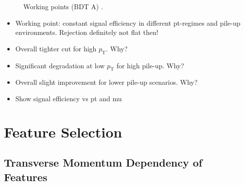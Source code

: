\begin{figure}[ht]
\begin{subfigure}[t]{0.48\textwidth}
  \end{subfigure}
  \caption{Working points (BDT A) .
    }
\end{figure}


\begin{itemize}
\item Working point: constant signal efficiency in different pt-regimes and
  pile-up environments. Rejection definitely not flat then!
\item Overall tighter cut for high $p_\text{T}$. Why?
\item Significant degradation at low $p_\text{T}$ for high pile-up. Why?
\item Overall slight improvement for lower pile-up scenarios. Why?
\item Show signal efficiency vs pt and mu
\end{itemize}

\section{Feature Selection}
\label{sec:bdt_feature_selection}

\subsection{Transverse Momentum Dependency of Features}
\label{sec:bdt_incl_pt}


